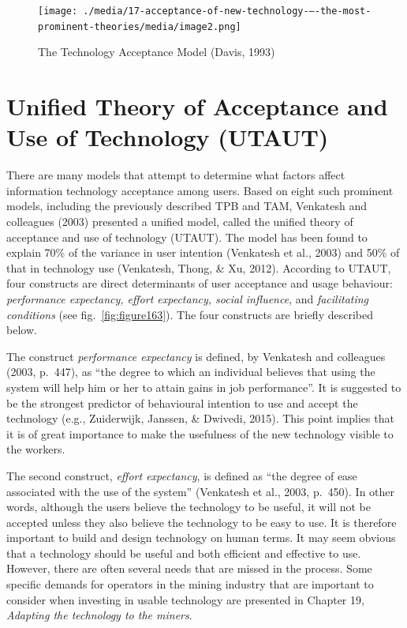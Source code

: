 \documentclass[
  12pt,
]{scrbook}
\begin{document}
\begin{figure}
\hypertarget{fig:figure162}{%
\centering
\texttt{[image: ./media/17-acceptance-of-new-technology-–-the-most-prominent-theories/media/image2.png]}
\caption[The Technology Acceptance Model (Davis, 1993)~]{The Technology Acceptance Model (Davis, 1993)~\footnotemark{}}\label{fig:figure162}
}
\end{figure}

\hypertarget{unified-theory-of-acceptance-and-use-of-technology-utaut}{%
\section*{Unified Theory of Acceptance and Use of Technology (UTAUT)}\label{unified-theory-of-acceptance-and-use-of-technology-utaut}}

There are many models that attempt to determine what factors affect information technology acceptance among users. Based on eight such prominent models, including the previously described TPB and TAM, Venkatesh and colleagues (2003) presented a unified model, called the unified theory of acceptance and use of technology (UTAUT). The model has been found to explain 70\% of the variance in user intention (Venkatesh et al., 2003) and 50\% of that in technology use (Venkatesh, Thong, \& Xu, 2012). According to UTAUT, four constructs are direct determinants of user acceptance and usage behaviour: \emph{performance expectancy, effort expectancy, social influence}, and \emph{facilitating conditions} (see fig.~\ref{fig:figure163}). The four constructs are briefly described below.

The construct \emph{performance expectancy} is defined, by Venkatesh and colleagues (2003, p.~447), as ``the degree to which an individual believes that using the system will help him or her to attain gains in job performance''. It is suggested to be the strongest predictor of behavioural intention to use and accept the technology (e.g., Zuiderwijk, Janssen, \& Dwivedi, 2015). This point implies that it is of great importance to make the usefulness of the new technology visible to the workers.~

The second construct, \emph{effort expectancy}, is defined as ``the degree of ease associated with the use of the system'' (Venkatesh et al., 2003, p.~450). In other words, although the users believe the technology to be useful, it will not be accepted unless they also believe the technology to be easy to use. It is therefore important to build and design technology on human terms. It may seem obvious that a technology should be useful and both efficient and effective to use. However, there are often several needs that are missed in the process. Some specific demands for operators in the mining industry that are important to consider when investing in usable technology are presented in Chapter 19, \emph{Adapting the technology to the miners}.
\end{document}
